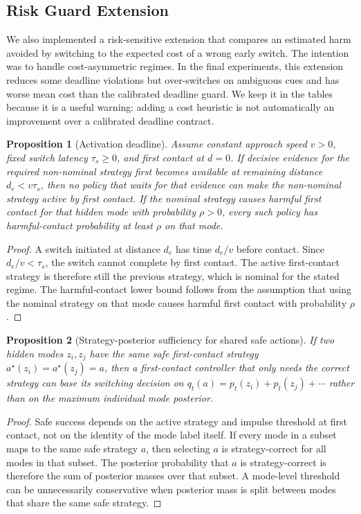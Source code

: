 \documentclass{article}
\newtheorem{proposition}{Proposition}
\begin{document}
\subsection{Risk Guard Extension}

We also implemented a risk-sensitive extension that compares an estimated harm avoided by switching to the expected cost of a wrong early switch. The intention was to handle cost-asymmetric regimes. In the final experiments, this extension reduces some deadline violations but over-switches on ambiguous cues and has worse mean cost than the calibrated deadline guard. We keep it in the tables because it is a useful warning: adding a cost heuristic is not automatically an improvement over a calibrated deadline contract.

\begin{proposition}[Activation deadline]
Assume constant approach speed $v>0$, fixed switch latency $\tau_s\geq0$, and first contact at $d=0$. If decisive evidence for the required non-nominal strategy first becomes available at remaining distance $d_e < v\tau_s$, then no policy that waits for that evidence can make the non-nominal strategy active by first contact. If the nominal strategy causes harmful first contact for that hidden mode with probability $\rho>0$, every such policy has harmful-contact probability at least $\rho$ on that mode.
\end{proposition}

\begin{proof}
A switch initiated at distance $d_e$ has time $d_e/v$ before contact. Since $d_e/v < \tau_s$, the switch cannot complete by first contact. The active first-contact strategy is therefore still the previous strategy, which is nominal for the stated regime. The harmful-contact lower bound follows from the assumption that using the nominal strategy on that mode causes harmful first contact with probability $\rho$.
\end{proof}

\begin{proposition}[Strategy-posterior sufficiency for shared safe actions]
If two hidden modes $z_i,z_j$ have the same safe first-contact strategy $a^\star(z_i)=a^\star(z_j)=a$, then a first-contact controller that only needs the correct strategy can base its switching decision on $q_t(a)=p_t(z_i)+p_t(z_j)+\cdots$ rather than on the maximum individual mode posterior.
\end{proposition}

\begin{proof}
Safe success depends on the active strategy and impulse threshold at first contact, not on the identity of the mode label itself. If every mode in a subset maps to the same safe strategy $a$, then selecting $a$ is strategy-correct for all modes in that subset. The posterior probability that $a$ is strategy-correct is therefore the sum of posterior masses over that subset. A mode-level threshold can be unnecessarily conservative when posterior mass is split between modes that share the same safe strategy.
\end{proof}
\end{document}
